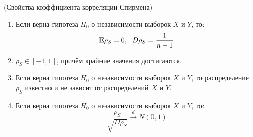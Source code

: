 \begin{proposition} (Свойства коэффициента корреляции Спирмена)
    \begin{enumerate}
        \item Если верна гипотеза $H_0$ о независимости выборок $X$ и $Y$, то:
        \[
            \mathbb{E} \rho_S = 0,\ \ D \rho_S = \frac{1}{n-1}
        \]

        \item $\rho_S \in [-1, 1]$, причём крайние значения достигаются.

        \item Если верна гипотеза $H_0$ о независимости выборок $X$ и $Y$, то распределение $\rho_S$ известно и не зависит от распределений $X$ и $Y$.

        \item Если верна гипотеза $H_0$ о независимости выборок $X$ и $Y$, то:
        \[
            \frac{\rho_S}{\sqrt{D \rho_S}} \xrightarrow{d} N(0, 1)
        \]
    \end{enumerate}
\end{proposition}

